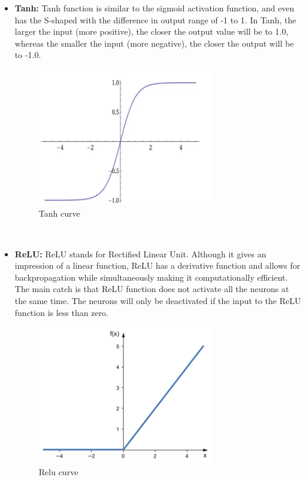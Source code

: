 \begin{enumerate}
        \begin{itemize}
            \item {\bf Tanh:} Tanh function is similar to the sigmoid activation function, and even has the S-shaped with the difference in output range of -1 to 1. In Tanh, the larger the input (more positive), the closer the output value will be to 1.0, whereas the smaller the input (more negative), the closer the output will be to -1.0. 
            \begin{figure}[ht]
                \centering
                \includegraphics[width=3in]{./figures/tanhcurve.png}
                \caption{ Tanh curve}
            \end{figure} \\
            \item {\bf ReLU:} ReLU stands for Rectified Linear Unit. Although it gives an impression of a linear function, ReLU has a derivative function and allows for backpropagation while simultaneously making it computationally efficient. The main catch is that ReLU function does not activate all the neurons at the same time. The neurons will only be deactivated if the input to the ReLU function is less than zero.
            \begin{figure}[ht]
                \centering
                \includegraphics[width=3in]{./figures/relucurve.png}
                \caption{ Relu curve}

\end{figure}
\end{itemize}
\end{enumerate}
